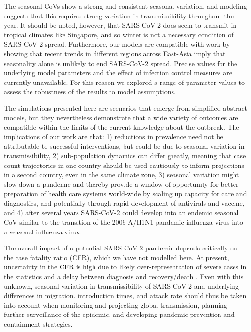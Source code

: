 \documentclass[rmp, reprint, superscriptaddress, floatfix,amsmath]{revtex4-1}
\begin{document}
The seasonal CoVs show a strong and consistent seasonal variation, and modeling suggests that this requires strong variation in transmissibility throughout the year.
It should be noted, however, that SARS-CoV-2 does seem to transmit in tropical climates like Singapore, and so winter is not a necessary condition of SARS-CoV-2 spread. 
Furthermore, our models are compatible with work by \citet{luo_role_2020} showing that recent trends in different regions across East-Asia imply that seasonality alone is unlikely to end SARS-CoV-2 spread.
Precise values for the underlying model parameters and the effect of infection control measures are currently unavailable. For this reason we explored a range of parameter values to assess the robustness of the results to model assumptions.

The simulations presented here are scenarios that emerge from simplified abstract models, but they nevertheless demonstrate that a wide variety of outcomes are compatible within the limits of the current knowledge about the outbreak. 
The implications of our work are that: 1) reductions in prevalence need not be attributable to successful interventions, but could be due to seasonal variation in transmissibility, 2) sub-population dynamics can differ greatly, meaning that case count trajectories in one country should be used cautiously to inform projections in a second country, even in the same climate zone, 3) seasonal variation might slow down a pandemic and thereby provide a window of opportunity for better preparation of health care systems world-wide by scaling up capacity for care and diagnostics, and potentially through rapid development of antivirals and vaccine, and 4) after several years SARS-CoV-2 could develop into an endemic seasonal CoV similar to the transition of the 2009 A/H1N1 pandemic influenza virus into a seasonal influenza virus.

The overall impact of a potential SARS-CoV-2 pandemic depends critically on the case fatality ratio (CFR), which we have not modelled here. 
At present, uncertainty in the CFR is high due to likely over-representation of severe cases in the statistics and a delay between diagnosis and recovery/death  \citep{battegay_2019-novel_2020}. 
Even with this unknown, seasonal variation in transmissibility of SARS-CoV-2 and underlying differences in migration, introduction times, and attack rate should thus be taken into account when monitoring and projecting global transmission, planning further surveillance of the epidemic, and developing pandemic prevention and containment strategies.
\end{document}
